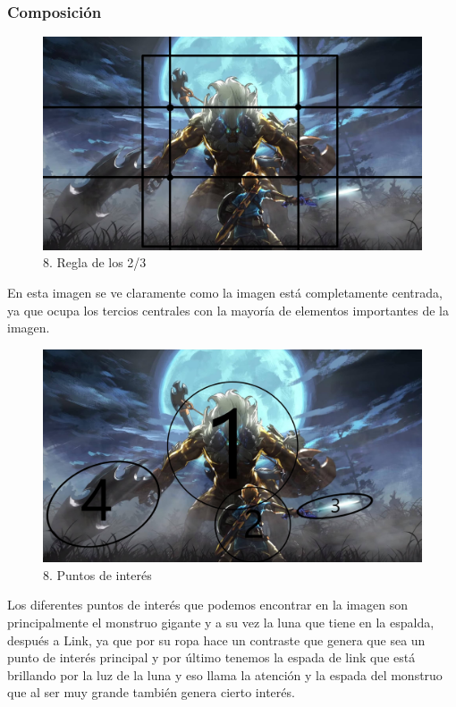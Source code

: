 \documentclass[12pt]{article}
\begin{document}
        \subsubsection{Composición}

\begin{figure}[H]
      \centering
      \includegraphics[width=\textwidth]{images/Raúl/Sección 8/Imagen 8 2 3.jpg}
      \caption{\small 8. Regla de los 2/3}
    \end{figure}

En esta imagen se ve claramente como la imagen está completamente centrada, ya que ocupa los tercios centrales con la mayoría de elementos importantes de la imagen.

\begin{figure}[H]
      \centering
      \includegraphics[width=\textwidth]{images/Raúl/Sección 8/Imagen 8 p. interes.jpg}
      \caption{\small 8. Puntos de interés}
    \end{figure}

Los diferentes puntos de interés que podemos encontrar en la imagen son principalmente el monstruo gigante y a su vez la luna que tiene en la espalda, después a Link, ya que por su ropa hace un contraste que genera que sea un punto de interés principal y por último tenemos la espada de link que está brillando por la luz de la luna y eso llama la atención y la espada del monstruo que al ser muy grande también genera cierto interés.
\end{document}
